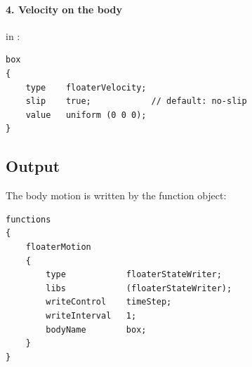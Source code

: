 \paragraph{4. Velocity on the body} in :
\begin{lstlisting}
box
{
    type    floaterVelocity;
    slip    true;            // default: no-slip
    value   uniform (0 0 0);
}
\end{lstlisting}

\subsection{Output}
The body motion is written by the  function object:
\begin{lstlisting}[caption={Writing the body motion (\file{system/controlDict}).}]
functions
{
    floaterMotion
    {
        type            floaterStateWriter;
        libs            (floaterStateWriter);
        writeControl    timeStep;
        writeInterval   1;
        bodyName        box;
    }
}
\end{lstlisting}

